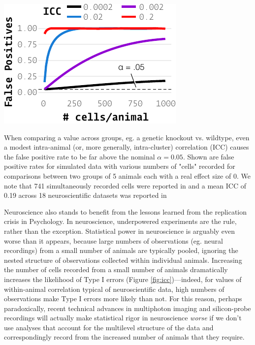 \begin{marginfigure}[2.6cm]
\includegraphics[]{figures/fpr.pdf}
\caption{When comparing a value across groups, eg. a genetic knockout vs. wildtype, even a modest intra-animal (or, more generally, intra-cluster) correlation (ICC) causes the false positive rate to be far above the nominal $\alpha = 0.05$. Shown are false positive rates for simulated data with various numbers of "cells" recorded for comparisons between two groups of 5 animals each with a real effect size of 0. We note that 741 simultaneously recorded cells were reported in \citep{junFullyIntegratedSilicon2017} and a mean ICC of 0.19 across 18 neuroscientific datasets was reported in \citep{aartsSolutionDependencyUsing2014}}
\label{fig:icc}
\end{marginfigure}

Neuroscience also stands to benefit from the lessons learned from the replication crisis in Psychology\citep{shroutPsychologyScienceKnowledge2018}. In neuroscience, underpowered experiments are the rule, rather than the exception\citep{buttonPowerFailureWhy2013}. Statistical power in neuroscience is arguably even worse than it appears, because large numbers of observations (eg. neural recordings) from a small number of animals are typically pooled, ignoring the nested structure of observations collected within individual animals. Increasing the number of cells recorded from a small number of animals dramatically increases the likelihood of Type I errors (Figure \ref{fig:icc})---indeed, for values of within-animal correlation typical of neuroscientific data, high numbers of observations make Type I errors more likely than not\citep{aartsSolutionDependencyUsing2014}. For this reason, perhaps paradoxically, recent technical advances in multiphoton imaging and silicon-probe recordings will actually make statistical rigor in neuroscience \textit{worse} if we don't use analyses that account for the multilevel structure of the data and correspondingly record from the increased number of animals that they require.




